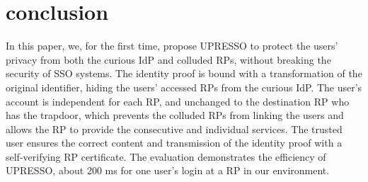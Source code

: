 \section{conclusion}
\label{sec:conclusion}
In this paper, we, for the first time, propose UPRESSO to protect the users' privacy from both the curious IdP and colluded RPs,  without breaking the security of SSO systems.
The identity proof is bound with a transformation of the original identifier, hiding the users' accessed RPs from the curious IdP. The user's account is independent for each RP, and unchanged to the destination RP who has the trapdoor, which prevents the colluded RPs from linking the users and allows the RP to provide the consecutive and individual services. The trusted user ensures the correct content and transmission of the identity proof with a self-verifying RP certificate. The evaluation demonstrates the efficiency of UPRESSO, about 200 ms for one user's login at a RP in our environment.

